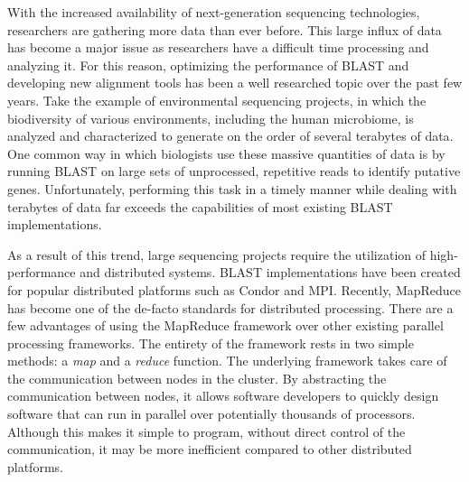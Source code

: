 With the increased availability of next-generation sequencing technologies, researchers are gathering more data than ever before. This large influx of data has become a major issue as researchers have a difficult time processing and analyzing it. For this reason, optimizing the performance of BLAST and developing new alignment tools has been a well researched topic over the past few years. Take the example of environmental sequencing projects, in which the biodiversity of various environments, including the human microbiome, is analyzed and characterized to generate on the order of several terabytes of data\cite{peterson2009nih}. One common way in which biologists use these massive quantities of data is by running BLAST on large sets of unprocessed, repetitive reads to identify putative genes\cite{li2010est,murray2002identification}. Unfortunately, performing this task in a timely manner while dealing with terabytes of data far exceeds the capabilities of most existing BLAST implementations.

As a result of this trend, large sequencing projects require the utilization of high-performance and distributed systems.
BLAST implementations have been created for popular distributed platforms such as Condor\cite{condor-hunter} and MPI\cite{darling2003design,dongarra1993proposal}.
Recently, MapReduce\cite{dean2008mapreduce} has become one of the de-facto standards for distributed processing.
There are a few advantages of using the MapReduce framework over other existing parallel processing frameworks. The entirety of the framework rests in two simple methods: a \emph{map} and a \emph{reduce} function.
The underlying framework takes care of the communication between nodes in the cluster.
By abstracting the communication between nodes, it allows software developers to quickly design software that can run in parallel over potentially thousands of processors.
Although this makes it simple to program, without direct control of the communication, it may be more inefficient compared to other distributed platforms.

